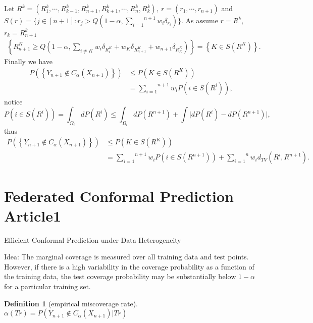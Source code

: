 \documentclass[12pt, a4paper, oneside]{article}
\newtheorem{definition}[theorem]{Definition}
\begin{document}
    Let $R^k=(R_1^k,\cdots,R_{k-1}^k,R_{n+1}^k,R_{k+1}^k,\cdots,R_n^k,R_k^k),\ r=(r_1,\cdots,r_{n+1})$ and $S(r)=\{j\in[n+1]:r_j>Q(1-\alpha,\overset{n+1}{\underset{i=1}\sum}w_i\delta_{r_i})\}$. As assume $r=R^k$, $r_k=R_{n+1}^k$
    \begin{align*}
        \left\{ R_{n+1}^K\geq Q(1-\alpha,\overset{}{\underset{i\neq K}\sum}w_i\delta_{R_i^K}+w_K\delta_{R_{n+1}^K}+w_{n+1}\delta_{R_K^K}) \right\}=\left\{ K\in S(R^K) \right\}.
    \end{align*}
    Finally we have
    \begin{align*}
        P(\left\{ Y_{n+1}\notin C_\alpha(X_{n+1}) \right\})&\leq P(K\in S(R^K))\\
        &=\overset{n+1}{\underset{i=1}\sum}w_iP(i\in S(R^i)),
    \end{align*}
    notice 
    \begin{equation*}
        P(i\in S(R^i))=\int_{\Omega_i}dP(R^i)\leq \int_{\Omega_i}dP(R^{n+1})+\int\Big|dP(R^i)-dP(R^{n+1})\Big|,
    \end{equation*}
    thus
    \begin{align*}
        P(\left\{ Y_{n+1}\notin C_\alpha(X_{n+1}) \right\})&\leq P(K\in S(R^K))\\
        &=\overset{n+1}{\underset{i=1}\sum}w_iP(i\in S(R^{n+1}))+\overset{n}{\underset{i=1}\sum}w_id_{TV}(R^i,R^{n+1}).
    \end{align*}


\section{Federated Conformal Prediction Article1}
    Efficient Conformal Prediction under Data Heterogeneity\cite{plassier2024efficient}


    Idea: The marginal coverage is measured over all training data and test points. However, if there is a high variability in the coverage probability as a function of the training data, the test coverage probability may be substantially below $1-\alpha$ for a particular training set.
    \begin{definition}[empirical miscoverage rate]
        $\alpha(Tr)=P(Y_{n+1}\notin C_\alpha(X_{n+1})|Tr)$
    \end{definition}
\end{document}
